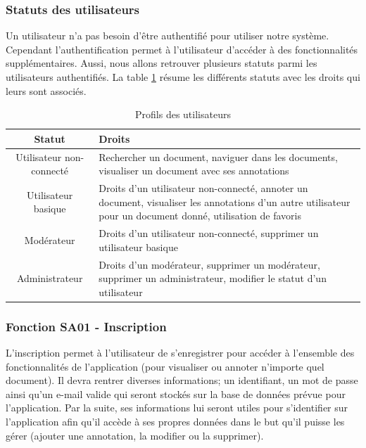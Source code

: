 \documentclass[a4paper]{article}
\begin{document}
\subsubsection{Statuts des utilisateurs}

Un utilisateur n'a pas besoin d'être authentifié pour utiliser notre système. Cependant l'authentification permet à l'utilisateur d'accéder à des fonctionnalités supplémentaires. Aussi, nous allons retrouver plusieurs statuts parmi les utilisateurs authentifiés. La table \ref{tab:profils} résume les différents statuts avec les droits qui leurs sont associés. 

\begin{table}[H]
	\centering
		\small
			\begin{tabular}{|c|p{7cm}|}
				\hline
					\rowcolor{lightgray}\textbf{Statut} & \textbf{Droits} \\
				\hline
					Utilisateur non-connecté & Rechercher un document, naviguer dans les documents, visualiser un document avec ses annotations \\
				\hline
					Utilisateur basique & Droits d'un utilisateur non-connecté, annoter un document, visualiser les annotations d'un autre utilisateur pour un document donné, utilisation de favoris \\
				\hline
					Modérateur & Droits d'un utilisateur non-connecté, supprimer un utilisateur basique\\
				\hline
					Administrateur & Droits d'un modérateur, supprimer un modérateur, supprimer un administrateur, modifier le statut d'un utilisateur \\
				\hline
			\end{tabular}
			\caption{Profils des utilisateurs}
		\normalsize
	\label{tab:profils}
\end{table}

\subsubsection{Fonction SA01 - Inscription}

L’inscription permet à l’utilisateur de s’enregistrer pour accéder à l’ensemble des fonctionnalités de l’application (pour visualiser ou annoter n’importe quel document). Il devra rentrer diverses informations; un identifiant, un mot de passe ainsi qu’un e-mail valide qui seront stockés sur la base de données prévue pour l’application. Par la suite, ses informations lui seront utiles pour s’identifier sur l’application afin qu’il accède à ses propres données dans le but qu’il puisse les gérer (ajouter une annotation, la modifier ou la supprimer).
    
\end{document}
